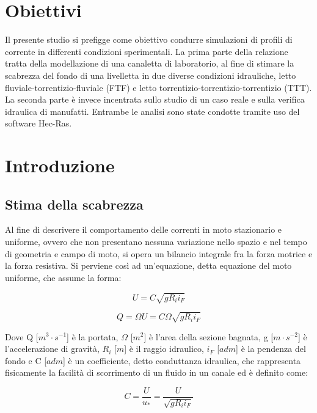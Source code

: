 \documentclass[12pt]{article} %
\begin{document}
\section{Obiettivi}

\noindent Il presente studio si prefigge come obiettivo condurre simulazioni di profili di corrente in differenti condizioni sperimentali.
La prima parte della relazione tratta della modellazione di una canaletta di laboratorio, al fine di stimare la scabrezza del fondo di una livelletta in due diverse condizioni idrauliche, letto fluviale-torrentizio-fluviale (FTF) e letto torrentizio-torrentizio-torrentizio (TTT). La seconda parte è invece incentrata sullo studio di un caso reale e sulla verifica idraulica di manufatti.
Entrambe le analisi sono state condotte tramite uso del software Hec-Ras.

\newpage
\section{Introduzione}
\subsection{Stima della scabrezza}
\noindent Al fine di descrivere il comportamento delle correnti in moto stazionario e uniforme, ovvero che non presentano nessuna variazione nello spazio e nel tempo di geometria e campo di moto, si opera un bilancio integrale fra la forza motrice e la forza resistiva. Si perviene così ad un’equazione, detta equazione del moto uniforme, che assume la forma:

\begin{equation}
    U=C\sqrt{gR_ii_F}
    \label{eqn:U_moto_uniforme}
\end{equation}

\begin{equation}
    Q=\Omega U=C\Omega\sqrt{gR_ii_F}
    \label{eqn:Q_moto_uniforme}
\end{equation}

\noindent Dove Q [$m^3\cdot s^{-1}$] è la portata, $\Omega$ [$m^2$] è l’area della sezione bagnata, g [$m\cdot s^{-2}$] è l’accelerazione di gravità, $R_i$ [$m$] è il raggio idraulico, $i_F$ [$adm$] è la pendenza del fondo e C [$adm$] è un coefficiente, detto conduttanza idraulica, che rappresenta fisicamente la facilità di scorrimento di un fluido in un canale ed è definito come:

\begin{equation}
    C=\frac{U}{u_*}=\frac{U}{\sqrt{gR_ii_F}}
    \label{eqn:C}
\end{equation}
\end{document}
